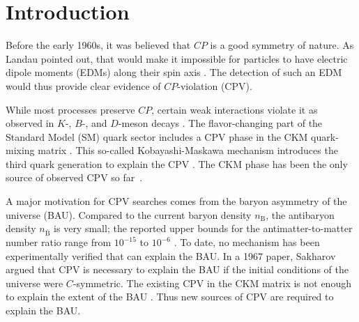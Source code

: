 \section{Introduction}
\label{sec:introduction}
Before the early 1960s, it was believed that $CP$ is a good symmetry of nature. As Landau pointed out, that would make it impossible for particles to have electric dipole moments (EDMs) along their spin axis \cite{landau1957conservation}. The detection of such an EDM would thus provide clear evidence of $CP$-violation (CPV).  

While most processes preserve $CP$, certain weak interactions violate it as observed in $K$-, $B$-, and $D$-meson decays \cite{christenson1964evidence, PDG18}. The flavor-changing part of the Standard Model (SM) quark sector includes a CPV phase in the CKM quark-mixing matrix \cite{peccei1995}. This so-called Kobayashi-Maskawa mechanism introduces the third quark generation to explain the CPV \cite{kobayashi1973cp}. The CKM phase has been the only source of observed CPV so far~\cite{PDG18}.

A major motivation for CPV searches comes from the baryon asymmetry of the universe (BAU). Compared to the current baryon density $n_{\text{B}}$, the antibaryon density $n_{\overline{\text{B}}}$ is very small; the reported upper bounds for the antimatter-to-matter number ratio range from $10^{-15}$ to $10^{-6}$ \cite{canetti2012matter}. To date, no mechanism has been experimentally verified that can explain the BAU. In a 1967 paper, Sakharov argued that CPV is necessary to explain the BAU \cite{sakharov1991violation} if the initial conditions of the universe were $C$-symmetric. The existing CPV in the CKM matrix is not enough to explain the extent of the BAU \cite{pospelov2005electric}. Thus new sources of CPV are required to explain the BAU.

